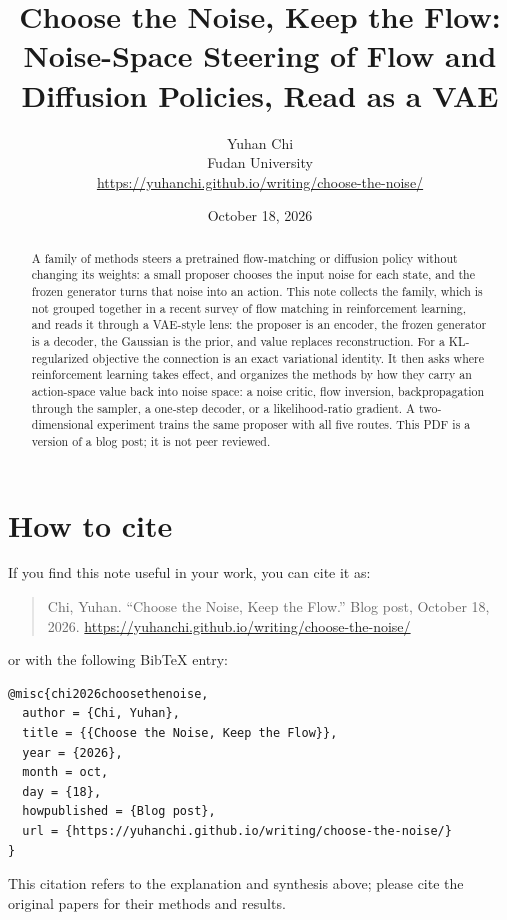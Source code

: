 \documentclass[11pt]{article}
\title{Choose the Noise, Keep the Flow:\\[2pt]
  \large Noise-Space Steering of Flow and Diffusion Policies, Read as a VAE}
\author{Yuhan Chi\\[2pt]
  \small Fudan University\\
  \small\url{https://yuhanchi.github.io/writing/choose-the-noise/}}
\date{October 18, 2026}
\begin{document}
\maketitle

\begin{abstract}
\noindent A family of methods steers a pretrained flow-matching or diffusion policy without
changing its weights: a small proposer chooses the input noise for each state, and the frozen
generator turns that noise into an action. This note collects the family, which is not
grouped together in a recent survey of flow matching in reinforcement learning, and reads it
through a VAE-style lens: the proposer is an encoder, the frozen generator is a decoder, the
Gaussian is the prior, and value replaces reconstruction. For a KL-regularized objective the
connection is an exact variational identity. It then asks where reinforcement learning takes
effect, and organizes the methods by how they carry an action-space value back into noise space:
a noise critic, flow inversion, backpropagation through the sampler, a one-step decoder, or a
likelihood-ratio gradient. A two-dimensional experiment trains the same proposer with all five
routes. This PDF is a version of a blog post; it is not peer reviewed.
\end{abstract}




\section*{How to cite}
If you find this note useful in your work, you can cite it as:

\begin{quote}
Chi, Yuhan. ``Choose the Noise, Keep the Flow.'' Blog post, October 18, 2026.
\url{https://yuhanchi.github.io/writing/choose-the-noise/}
\end{quote}

or with the following BibTeX entry:

\noindent\begin{minipage}{\linewidth}
\begin{verbatim}
@misc{chi2026choosethenoise,
  author = {Chi, Yuhan},
  title = {{Choose the Noise, Keep the Flow}},
  year = {2026},
  month = oct,
  day = {18},
  howpublished = {Blog post},
  url = {https://yuhanchi.github.io/writing/choose-the-noise/}
}
\end{verbatim}
\end{minipage}
\medskip

This citation refers to the explanation and synthesis above; please cite the original papers
for their methods and results.
\end{document}
